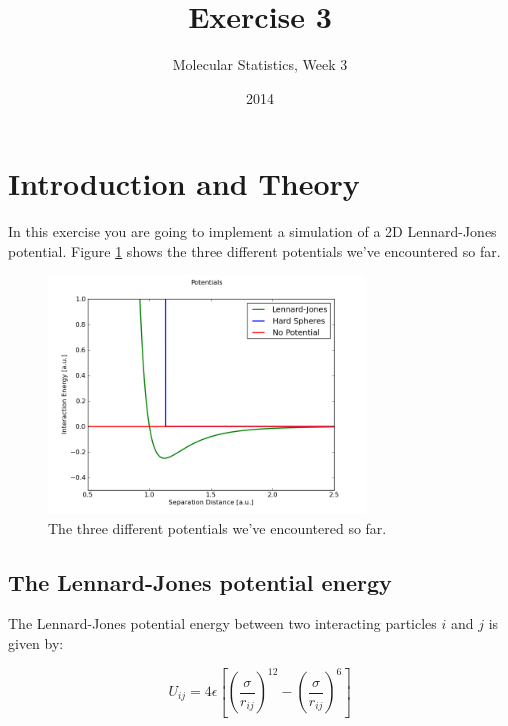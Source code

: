 \documentclass{article}
\title{Exercise 3}
\author{Molecular Statistics, Week 3}
\date{2014}
\begin{document}

\maketitle


\section{Introduction and Theory}

In this exercise you are going to implement a simulation of a 2D Lennard-Jones potential.
Figure \ref{fig:potentials} shows the three different potentials we've encountered so far.

\begin{figure}[h!]
\begin{center}
    \includegraphics[width=0.75\textwidth]{potentials.png}
    \caption{The three different potentials we've encountered so far.}
    \label{fig:potentials}
\end{center}
\end{figure}


\subsection{The Lennard-Jones potential energy}

The Lennard-Jones potential energy between two interacting particles $i$ and $j$ is given by:

\begin{equation}
    U_{ij} = 4 \epsilon \left[ \left(\frac{\sigma}{r_{ij}} \right)^{12} - \left(\frac{\sigma}{r_{ij}} \right)^6 \right]
\end{equation}
\end{document}
